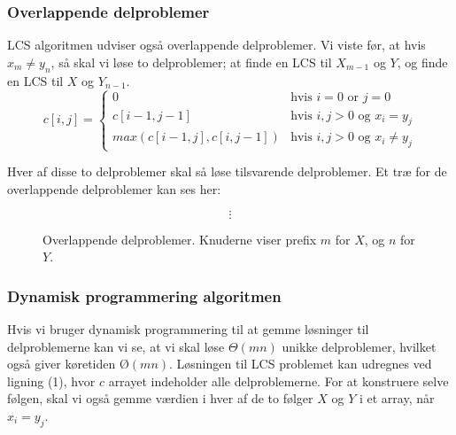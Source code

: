 \subsubsection{Overlappende delproblemer}
LCS algoritmen udviser også overlappende delproblemer. Vi viste før, at hvis $x_m \neq y_n$, så skal vi løse to delproblemer; at finde en LCS til $X_{m-1}$ og $Y$, og finde en LCS til $X$ og $Y_{n-1}$.
\begin{equation}
  c[i,j] = 
  \begin{cases}
    0 & \text{hvis } i=0 \text{ or } j=0\\
    c[i-1, j-1] & \text{hvis } i,j > 0 \text{ og } x_i = y_j\\
    max(c[i-1, j], c[i, j-1]) & \text{hvis } i,j > 0 \text{ og } x_i \neq y_j
  \end{cases}
\end{equation}

Hver af disse to delproblemer skal så løse tilsvarende delproblemer. Et træ for de overlappende delproblemer kan ses her:
\begin{figure}[h!]
  \caption{Overlappende delproblemer. Knuderne viser prefix $m$ for $X$, og $n$ for $Y$.}
\begin{center}
        $$\vdots$$
\end{center}
\end{figure}

\subsubsection{Dynamisk programmering algoritmen}
Hvis vi bruger dynamisk programmering til at gemme løsninger til delproblemerne kan vi se, at vi skal løse $\Theta(mn)$ unikke delproblemer, hvilket også giver køretiden $Ø(mn)$. Løsningen til LCS problemet kan udregnes ved ligning (1), hvor $c$ arrayet indeholder alle delproblemerne. For at konstruere selve følgen, skal vi også gemme værdien i hver af de to følger $X$ og $Y$ i et array, når $x_i = y_j$.
